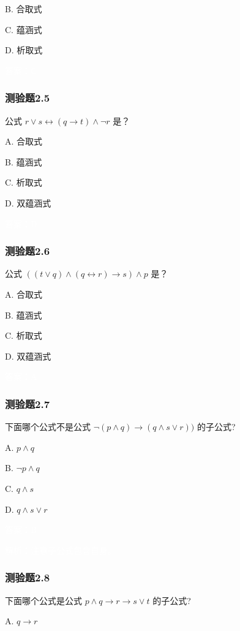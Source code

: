 \documentclass[UTF8, heading=true]{ctexart}
\begin{document}
B. 合取式

C. 蕴涵式

D. 析取式

\textcolor{white}{答案：C}

\subsubsection{测验题2.5}

公式 $r \vee s \leftrightarrow(q \rightarrow t) \wedge \neg r$ 是？

A. 合取式

B. 蕴涵式

C. 析取式

D. 双蕴涵式

\textcolor{white}{答案：D}

\subsubsection{测验题2.6}

公式 $((t \vee q) \wedge(q \leftrightarrow r) \rightarrow s) \wedge p$ 是？

A. 合取式

B. 蕴涵式

C. 析取式

D. 双蕴涵式

\textcolor{white}{答案：A}

\subsubsection{测验题2.7}

下面哪个公式不是公式 $\neg(p \wedge q) \rightarrow(q \wedge s \vee r))$ 的子公式? $\qquad$

A. $
p \wedge q
$

B. $
\neg p \wedge q
$

C. $
q \wedge s
$

D. $
q \wedge s \vee r
$

\textcolor{white}{答案：B}

\textcolor{white}{解析：注意子公式包含自身。}

\subsubsection{测验题2.8}

下面哪个公式是公式 $p \wedge q \rightarrow r \rightarrow s \vee t$ 的子公式?

A. $q \rightarrow r$
\end{document}
